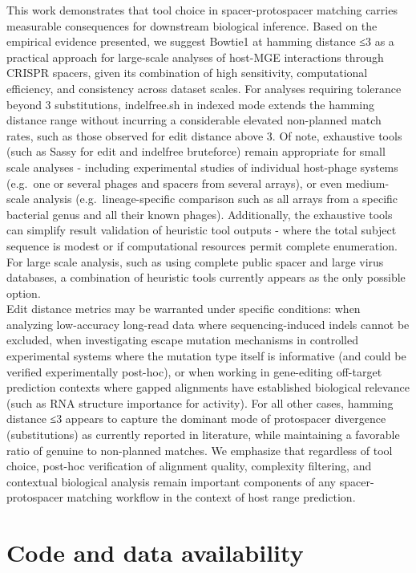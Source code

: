 \documentclass[
]{article}
\begin{document}
This work demonstrates that tool choice in spacer-protospacer matching
carries measurable consequences for downstream biological inference.
Based on the empirical evidence presented, we suggest Bowtie1 at hamming
distance ≤3 as a practical approach for large-scale analyses of host-MGE
interactions through CRISPR spacers, given its combination of high
sensitivity, computational efficiency, and consistency across dataset
scales. For analyses requiring tolerance beyond 3 substitutions,
indelfree.sh in indexed mode extends the hamming distance range without
incurring a considerable elevated non-planned match rates, such as those
observed for edit distance above 3. Of note, exhaustive tools (such as
Sassy for edit and indelfree bruteforce) remain appropriate for small
scale analyses - including experimental studies of individual host-phage
systems (e.g.~one or several phages and spacers from several arrays), or
even medium-scale analysis (e.g.~lineage-specific comparison such as all
arrays from a specific bacterial genus and all their known phages).
Additionally, the exhaustive tools can simplify result validation of
heuristic tool outputs - where the total subject sequence is modest or
if computational resources permit complete enumeration. For large scale
analysis, such as using complete public spacer and large virus
databases, a combination of heuristic tools currently appears as the
only possible option.\\
Edit distance metrics may be warranted under specific conditions: when
analyzing low-accuracy long-read data where sequencing-induced indels
cannot be excluded, when investigating escape mutation mechanisms in
controlled experimental systems where the mutation type itself is
informative (and could be verified experimentally post-hoc), or when
working in gene-editing off-target prediction contexts where gapped
alignments have established biological relevance (such as RNA structure
importance for activity). For all other cases, hamming distance ≤3
appears to capture the dominant mode of protospacer divergence
(substitutions) as currently reported in literature, while maintaining a
favorable ratio of genuine to non-planned matches. We emphasize that
regardless of tool choice, post-hoc verification of alignment quality,
complexity filtering, and contextual biological analysis remain
important components of any spacer-protospacer matching workflow in the
context of host range prediction.

\section{Code and data availability}\label{sec-code-data}
\end{document}
